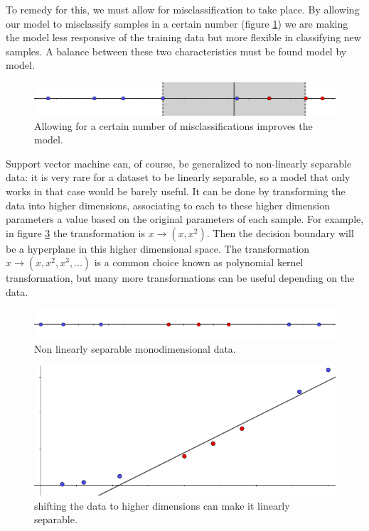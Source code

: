 \documentclass[a4paper]{report}
\begin{document}
To remedy for this, we must allow for misclassification to take place.
By allowing our model to misclassify samples in a certain number (figure \ref{1dim_alw}) we are making the model less responsive of the training data but more flexible in classifying new samples.
A balance between these two characteristics must be found model by model.

\begin{figure} [H]
	\centering
	\includegraphics [width=\textwidth ]{svm/1dim_alw.png}
	\caption{Allowing for a certain number of  misclassifications improves the model.}
	\label{1dim_alw}
\end{figure}

Support vector machine can, of course, be generalized to non-linearly separable data:
it is very rare for a dataset to be linearly separable, so a model that only works in that case would be barely useful.
It can be done by transforming the data into higher dimensions, associating to each to these higher dimension parameters a value based on the original parameters of each sample.
For example, in figure \ref{2dim} the transformation is $x \xrightarrow{}(x,x^2)$.
Then the decision boundary will be a hyperplane in this higher dimensional space.
The transformation $x \xrightarrow{} (x, x^2, x^3, ...)$ is a common choice known as polynomial kernel transformation, but many more transformations can be useful depending on the data.

\begin{figure} [H]
	\centering
	\includegraphics [width=\textwidth ]{svm/1dim_ns.png}
	\caption{Non linearly separable monodimensional data.}
	\label{1dim_ns}
\end{figure}

\begin{figure} [H]
	\centering
	\includegraphics [width=\textwidth ]{svm/2dim.png}
	\caption{shifting the data to higher dimensions can make it linearly separable.}
	\label{2dim}
\end{figure}
\end{document}
